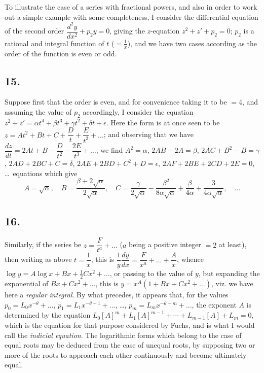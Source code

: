 \documentclass[11pt,a4paper]{book}
\begin{document}
To illustrate the case of a series with fractional powers, and also in order to work out a simple example with some completeness, I consider the differential equation of the second order $\dfrac{d^2y}{dx^2} + p_2 y = 0$, giving the $z$-equation $z^2 + z' + p_2 = 0$; $p_2$ is a rational and integral function of $t$ ($= \frac{1}{x}$), and we have two cases according as the order of the function is even or odd.

\subsection*{15.}

Suppose first that the order is even, and for convenience taking it to be $= 4$, and assuming the value of $p_2$ accordingly, I consider the equation $z^2 + z' = \alpha t^4 + \beta t^3 + \gamma t^2 + \delta t + \epsilon$. Here the form is at once seen to be $z = At^2 + Bt + C + \dfrac{D}{t} + \dfrac{E}{t^2} + \ldots$; and observing that we have $\dfrac{dz}{dt} = 2At + B - \dfrac{D}{t^2} - \dfrac{2E}{t^3} + \ldots$, we find $A^2 = \alpha$, $2AB - 2A = \beta$, $2AC + B^2 - B = \gamma$, $2AD + 2BC + C = \delta$, $2AE + 2BD + C^2 + D = \epsilon$, $2AF + 2BE + 2CD + 2E = 0$, \ldots\ equations which give
\[
A = \sqrt{\alpha}, \quad B = \frac{\beta + 2\sqrt{\alpha}}{2\sqrt{\alpha}}, \quad C = \frac{\gamma}{2\sqrt{\alpha}} - \frac{\beta^2}{8\alpha\sqrt{\alpha}} + \frac{\beta}{4\alpha} + \frac{3}{4\alpha\sqrt{\alpha}}, \quad \ldots
\]

\subsection*{16.}

Similarly, if the series be $z = \dfrac{F}{t^a} + \ldots$ ($a$ being a positive integer $= 2$ at least), then writing as above $t = \dfrac{1}{x}$, this is $\dfrac{1}{y}\dfrac{dy}{dx} = \dfrac{F}{x^a} + \ldots + \dfrac{A}{x}$, whence $\log y = A \log x + Bx + \tfrac{1}{2}Cx^2 + \ldots$, or passing to the value of $y$, but expanding the exponential of $Bx + Cx^2 + \ldots$, this is $y = x^A(1 + Bx + Cx^2 + \ldots)$, viz. we have here a \textit{regular integral}. By what precedes, it appears that, for the values $p_0 = L_0 x^{-\theta} + \ldots$, $p_1 = L_1 x^{-\theta - 1} + \ldots$, \ldots, $p_m = L_m x^{-\theta - m} + \ldots$, the exponent $A$ is determined by the equation $L_0 [A]^m + L_1 [A]^{m-1} + \cdots + L_{m-1}[A] + L_m = 0$, which is the equation for that purpose considered by Fuchs, and is what I would call the \textit{indicial equation}. The logarithmic forms which belong to the case of equal roots may be deduced from the case of unequal roots, by supposing two or more of the roots to approach each other continuously and become ultimately equal.
\end{document}
